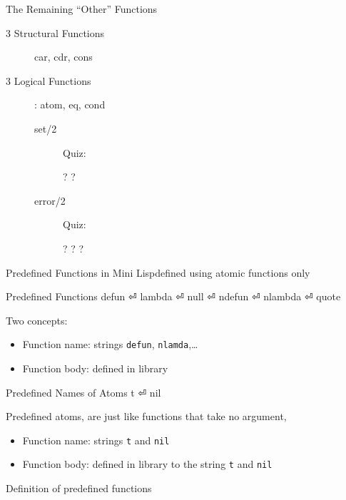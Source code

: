 \documentclass[fleqn]{beamer}
\begin{document}
\begin{frame}{The Remaining ``Other'' Functions}
\begin{description}
  \item[3 Structural Functions] car, cdr, cons
  \item[3 Logical Functions]: atom, eq, cond
    \begin{description}
      \item[set/2] Quiz:
        \begin{itemize}
          ?
          ?
        \end{itemize}
      \item[error/2] Quiz:
        \begin{itemize}
          ?
          ?
          ?
        \end{itemize}
    \end{description}
\end{description}
\end{frame}

\begin{frame}{Predefined Functions in Mini Lisp}{defined using atomic functions only}
\begin{block}{Predefined Functions}
  defun ⏎
  lambda ⏎
  null ⏎
  ndefun ⏎
  nlambda ⏎
  quote
\end{block}
Two concepts:
\begin{itemize}
  \item Function name: strings \texttt{defun}, \texttt{nlamda},…
  \item Function body: defined in library
\end{itemize}
\pause
\begin{block}{Predefined Names of Atoms}
  t ⏎
  nil
\end{block}

Predefined atoms, are just like functions that take no argument,
\begin{itemize}
  \item Function name: strings \texttt{t} and \texttt{nil}
  \item Function body: defined in library to the string \texttt{t} and \texttt{nil}
\end{itemize}
\end{frame}

\begin{frame}{Definition of predefined functions}
\begin{LTR}
  
\end{LTR}
\end{frame}
\end{document}
